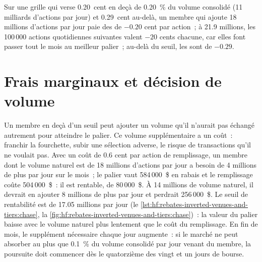 Sur une grille qui verse 0.20~cent en deçà de 0.20~\% du volume consolidé (11 milliards d'actions par jour) et 0.29~cent au-delà, un membre qui ajoute 18 millions d'actions
par jour paie des  de $-0.20$ cent par action~; à 21.9 millions, les 100\,000 actions quotidiennes suivantes valent $-20$ cents chacune, car elles font passer
tout le mois au meilleur palier~; au-delà du seuil, les  sont de $-0.29$.

\section{Frais marginaux et décision de volume}

Un membre en deçà d'un seuil peut ajouter un volume qu'il n'aurait pas échangé autrement pour atteindre le palier. Ce volume supplémentaire a un coût~: franchir la fourchette, subir une
sélection adverse, le risque de transactions qu'il ne voulait pas. Avec un coût de 0.6 cent par action de remplissage, un membre dont le volume naturel est de 18 millions d'actions par jour a besoin de
4 millions de plus par jour sur le mois~; le palier vaut 584\,000~\$ en rabais et le remplissage coûte 504\,000~\$~: il est rentable, de 80\,000~\$. À 14 millions de volume naturel, il devrait
en ajouter 8 millions de plus par jour et perdrait 256\,000~\$. Le seuil de rentabilité est de 17.05 millions par jour
(le \cref{lst:hf:rebates-inverted-venues-and-tiers:chase}, la \cref{fig:hf:rebates-inverted-venues-and-tiers:chase})~: la valeur du palier baisse avec
le volume naturel plus lentement que le coût du remplissage. En fin de mois, le supplément nécessaire chaque jour augmente~: si le marché ne peut absorber au plus que 0.1~\% du
volume consolidé par jour venant du membre, la poursuite doit commencer dès le quatorzième des vingt et un jours de bourse.

